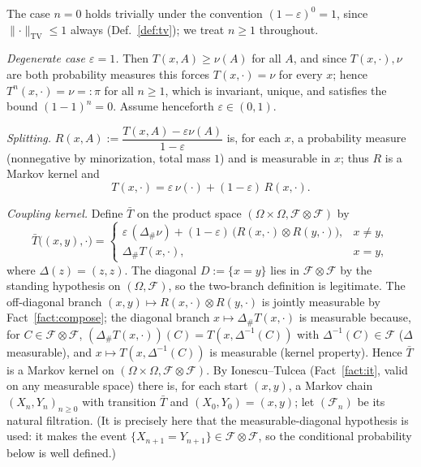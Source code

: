 \documentclass[11pt]{article}
\makeatletter
\theoremstyle{definitionbreak}
\theoremstyle{plainbreak}
\theoremstyle{remarkbreak}
\renewenvironment{proof}[1][\proofname]{\par
  \pushQED{\qed}\normalfont
  \topsep6\p@\@plus6\p@\relax
  \trivlist
  \item[\hskip\labelsep\itshape #1\@addpunct{.}]\mbox{}\par\nobreak\ignorespaces
}{\popQED\endtrivlist\@endpefalse}
\newcommand{\cF}{\mathcal{F}}
\newcommand{\Om}{\Omega}
\newcommand{\TV}{\mathrm{TV}}
\newcommand{\push}{{}_{\#}}
\newcommand{\norm}[1]{\lVert #1 \rVert}
\makeatother
\begin{document}
\begin{proof}
The case $n=0$ holds trivially under the convention $(1-\varepsilon)^0=1$, since $\norm{\cdot}_\TV\le1$
always (Def.~\ref{def:tv}); we treat $n\ge1$ throughout.

\emph{Degenerate case $\varepsilon=1$.} Then $T(x,A)\ge\nu(A)$ for all $A$, and since $T(x,\cdot),\nu$
are both probability measures this forces $T(x,\cdot)=\nu$ for every $x$; hence
$T^n(x,\cdot)=\nu=:\pi$ for all $n\ge1$, which is invariant, unique, and satisfies the bound
$(1-1)^n=0$. Assume henceforth $\varepsilon\in(0,1)$.

\emph{Splitting.} $R(x,A):=\dfrac{T(x,A)-\varepsilon\nu(A)}{1-\varepsilon}$ is, for each $x$, a
probability measure (nonnegative by minorization, total mass $1$) and is measurable in $x$; thus $R$
is a Markov kernel and
\begin{equation}\label{eq:split}
  T(x,\cdot)=\varepsilon\,\nu(\cdot)+(1-\varepsilon)\,R(x,\cdot).
\end{equation}

\emph{Coupling kernel.} Define $\bar T$ on the product space $(\Om\times\Om,\cF\otimes\cF)$ by
\[
  \bar T\big((x,y),\cdot\big)=
  \begin{cases}
    \varepsilon\,(\Delta\push\nu)+(1-\varepsilon)\,\big(R(x,\cdot)\otimes R(y,\cdot)\big), & x\neq y,\\[2pt]
    \Delta\push T(x,\cdot), & x=y,
  \end{cases}
\]
where $\Delta(z)=(z,z)$. The diagonal $D:=\{x=y\}$ lies in $\cF\otimes\cF$ by the standing hypothesis
on $(\Om,\cF)$, so the two-branch definition is legitimate. The off-diagonal branch
$(x,y)\mapsto R(x,\cdot)\otimes R(y,\cdot)$ is jointly measurable by Fact~\ref{fact:compose}; the
diagonal branch $x\mapsto\Delta\push T(x,\cdot)$ is measurable because, for $C\in\cF\otimes\cF$,
$(\Delta\push T(x,\cdot))(C)=T(x,\Delta^{-1}(C))$ with $\Delta^{-1}(C)\in\cF$ ($\Delta$ measurable),
and $x\mapsto T(x,\Delta^{-1}(C))$ is measurable (kernel property). Hence $\bar T$ is a Markov kernel
on $(\Om\times\Om,\cF\otimes\cF)$. By Ionescu--Tulcea (Fact~\ref{fact:it}, valid on any measurable
space) there is, for each start $(x,y)$, a Markov chain $(X_n,Y_n)_{n\ge0}$ with transition $\bar T$
and $(X_0,Y_0)=(x,y)$; let $(\mathcal F_n)$ be its natural filtration. (It is precisely here that the
measurable-diagonal hypothesis is used: it makes the event $\{X_{n+1}=Y_{n+1}\}\in\cF\otimes\cF$, so
the conditional probability below is well defined.)


\end{proof}
\end{document}
